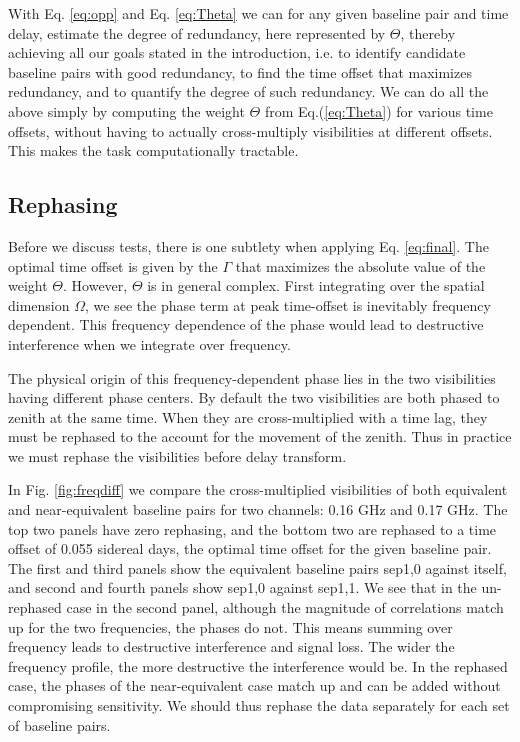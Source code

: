 \documentclass[twocolumn,apj,numberedappendix]{emulateapj}
\renewcommand\[{\begin{equation}}
\renewcommand\]{\end{equation}}
\begin{document}
With Eq. \ref{eq:opp} and Eq. \ref{eq:Theta} we can for any given baseline pair and time delay, estimate the degree of redundancy, here represented by $\Theta$, thereby achieving all our goals stated in the introduction, i.e. to identify 
candidate baseline pairs with good redundancy, to find the time offset that maximizes redundancy, and to quantify the degree of such redundancy. We can do all the above simply by computing the weight $\Theta$ from
Eq.(\ref{eq:Theta}) for various time offsets, without having to actually cross-multiply visibilities at different offsets. This makes the task computationally tractable. 

\subsection{Rephasing \label{sec:rephs}}
Before we discuss tests, there is one subtlety when applying Eq. \ref{eq:final}. The optimal time offset is given by the $\Gamma$ that maximizes the absolute value of the weight $\Theta$. However, $\Theta$ is in general complex. First integrating over the spatial dimension $\Omega$, we see the phase term at peak time-offset is inevitably frequency dependent. This frequency dependence of the phase would lead to destructive interference when we integrate over frequency.

The physical origin of this frequency-dependent phase lies in the two visibilities having different phase centers. By default the two visibilities are both phased to zenith at the same time. When they are cross-multiplied with a time lag, they must be rephased to the account for the movement of the zenith. Thus in practice we must rephase the visibilities before delay transform. 


In Fig. \ref{fig:freqdiff} we compare the cross-multiplied visibilities of both equivalent and near-equivalent baseline pairs for two channels: 0.16 GHz and 0.17 GHz. The top two panels have zero rephasing, and the bottom two are rephased to a time offset of 0.055 sidereal days, the optimal time offset for the given baseline pair. The first and third panels show the equivalent baseline pairs sep1,0 against itself, and second and fourth panels show sep1,0 against sep1,1. We see that in the un-rephased case in the second panel, although the magnitude of correlations match up for the two frequencies, the phases do not. This means summing over frequency leads to destructive interference and signal loss. The wider the frequency profile, the more destructive the interference would be. In the rephased case, the phases of the near-equivalent case match up and can be added without compromising sensitivity. We should thus rephase the data separately for each set of baseline pairs. 
\end{document}
